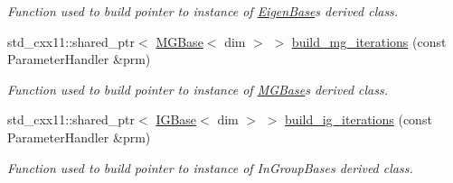 \begin{DoxyCompactItemize}
\begin{DoxyCompactList}\small\item\em Function used to build pointer to instance of \hyperlink{class_eigen_base}{Eigen\+Base}\textquotesingle{}s derived class. \end{DoxyCompactList}\item 
std\+\_\+cxx11\+::shared\+\_\+ptr$<$ \hyperlink{class_m_g_base}{M\+G\+Base}$<$ dim $>$ $>$ \hyperlink{class_bart_driver_af0c96d5fe57cdb8df75e1fb93ce6196b}{build\+\_\+mg\+\_\+iterations} (const Parameter\+Handler \&prm)
\begin{DoxyCompactList}\small\item\em Function used to build pointer to instance of \hyperlink{class_m_g_base}{M\+G\+Base}\textquotesingle{}s derived class. \end{DoxyCompactList}\item 
std\+\_\+cxx11\+::shared\+\_\+ptr$<$ \hyperlink{class_i_g_base}{I\+G\+Base}$<$ dim $>$ $>$ \hyperlink{class_bart_driver_adc7ebcc2b3d02b7058410abef7e1b8a5}{build\+\_\+ig\+\_\+iterations} (const Parameter\+Handler \&prm)
\begin{DoxyCompactList}\small\item\em Function used to build pointer to instance of In\+Group\+Base\textquotesingle{}s derived class. \end{DoxyCompactList}\end{DoxyCompactItemize}
